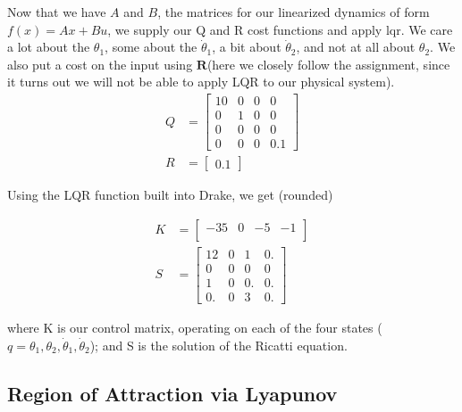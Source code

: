\documentclass[conference]{IEEEtran}
\begin{document}
Now that we have $A$ and $B$, the matrices for our linearized dynamics of form
$f(x) = Ax + Bu$, we supply our Q and R cost functions and apply lqr. We care a
lot about the $\theta_1$, some about the $\dot\theta_1$, a bit about
$\dot\theta_2$, and not at all about $\theta_2$.  We also put a cost on the
input using $\textbf{R}$(here we closely follow the
assignment, since it turns out we will not be able to apply LQR to our physical
system).
\begin{align}
    Q &=
    \begin{bmatrix}
        10 & 0 & 0 & 0 \\
        0 & 1 & 0 & 0 \\
        0 & 0 & 0 & 0 \\
        0 & 0 & 0 & 0.1
    \end{bmatrix}\\
    R &= \begin{bmatrix} 0.1 \end{bmatrix}
\end{align}

Using the LQR function built into Drake, we get (rounded)

\begin{align}
    K &=
    \begin{bmatrix}
        -35 & 0 & -5 & -1 \\
    \end{bmatrix}\\
    S &=
    \begin{bmatrix}
        12 & 0 & 1  & 0. \\
        0 & 0 & 0 & 0 \\
        1 & 0 & 0. & 0. \\
        0. & 0 & 3 & 0.
    \end{bmatrix}
\end{align}

where K is our control matrix, operating on each of the four states ($q =
\theta_1, \theta_2, \dot \theta_1, \dot \theta_2$); and S is the solution of the
Ricatti equation.


\subsection{Region of Attraction via Lyapunov}
\end{document}
